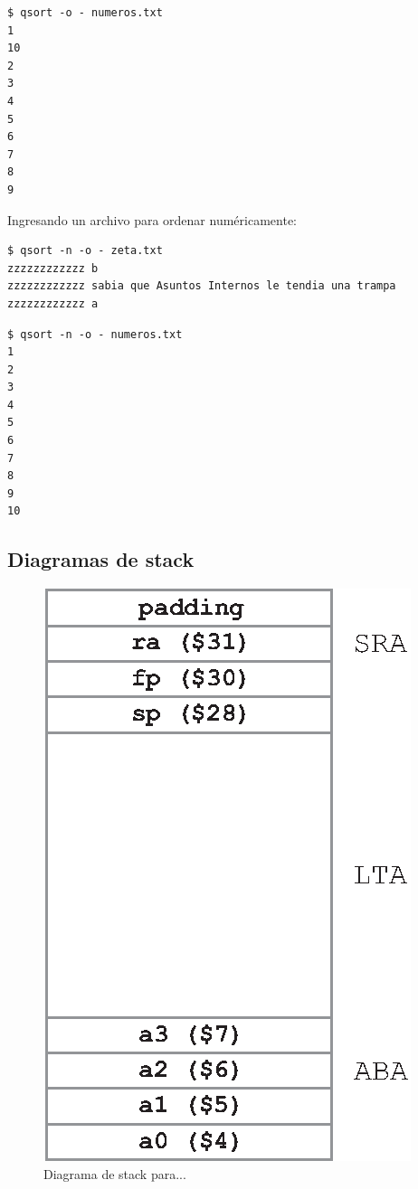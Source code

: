 \documentclass[a4paper, 12pt]{article}
\begin{document}
	\begin{verbatim}
$ qsort -o - numeros.txt
1
10
2
3
4
5
6
7
8
9
	\end{verbatim}
	
	Ingresando un archivo para ordenar numéricamente:
	\begin{verbatim}
$ qsort -n -o - zeta.txt
zzzzzzzzzzzz b
zzzzzzzzzzzz sabia que Asuntos Internos le tendia una trampa
zzzzzzzzzzzz a
	\end{verbatim}
	
	\begin{verbatim}
$ qsort -n -o - numeros.txt
1
2
3
4
5
6
7
8
9
10
	\end{verbatim}

	\subsection{Diagramas de stack}
	
	\begin{figure}[H]
		\centering
		\includegraphics[scale=1]{files/stack_frame.eps}
		\caption{Diagrama de stack para...}
		\label{fig:diag:stack}
	\end{figure}
\end{document}

